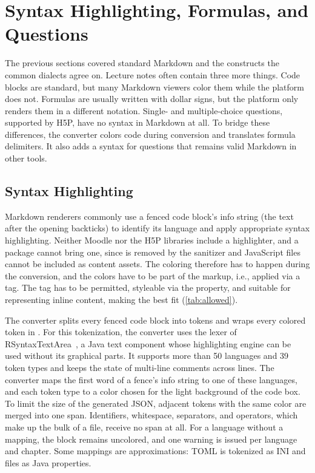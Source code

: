 \section{Syntax Highlighting, Formulas, and Questions}
\label{sec:extensions}

The previous sections covered standard Markdown and the constructs the common dialects agree on.
Lecture notes often contain three more things.
Code blocks are standard, but many Markdown viewers color them while the platform does not.
Formulas are usually written with dollar signs, but the platform only renders them in a different
notation.
Single- and multiple-choice questions, supported by H5P, have no syntax in Markdown at all.
To bridge these differences, the converter colors code during conversion and translates formula delimiters.
It also adds a syntax for questions that remains valid Markdown in other tools.

\subsection{Syntax Highlighting}
\label{sec:ex_code}

Markdown renderers commonly use a fenced code block's info string (the text after the opening backticks) to identify its language and apply appropriate syntax highlighting.
Neither Moodle nor the H5P libraries include a highlighter, and a package cannot bring one, since
 is removed by the sanitizer and JavaScript files cannot be included as content assets.
The coloring therefore has to happen during the conversion, and the colors have to be part of the
markup, i.e., applied via a tag.
The tag has to be permitted, styleable via the  property, and suitable for representing inline content,
making  the best fit (\autoref{tab:allowed}).

The converter splits every fenced code block into tokens and wraps every colored token in
.
For this tokenization, the converter uses the lexer of RSyntaxTextArea~\cite{RSyntaxTextArea}, a Java
text component whose highlighting engine can be used without its graphical parts.
It supports more than 50 languages and 39 token types and keeps the state of multi-line comments across lines.
The converter maps the first word of a fence's info string to one of these languages, and each token
type to a color chosen for the light background of the code box.
To limit the size of the generated JSON, adjacent tokens with the same color are merged into one
span.
Identifiers, whitespace, separators, and operators, which make up the bulk of a file, receive
no span at all.
For a language without a mapping, the block remains uncolored, and one warning is issued per language
and chapter.
Some mappings are approximations: TOML is tokenized as INI and  files as Java properties.

